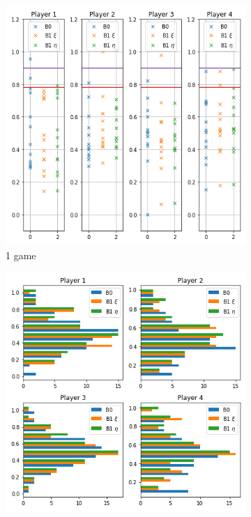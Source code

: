 \begin{figure}[ht]
\begin{subfigure}{0.5\textwidth}
    \centering
    \includegraphics[width=1\linewidth]{Bilder/example_1}
    \caption{1 game}
    \label{fig:17}
\end{subfigure}
\begin{subfigure}{0.5\textwidth}
    \centering
    \includegraphics[width=1\linewidth]{Bilder/example_2}

\end{subfigure}
\end{figure}
